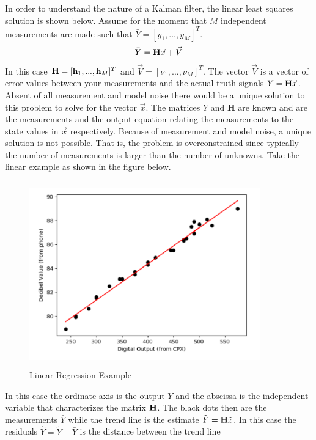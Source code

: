 \documentclass{article}
\begin{document}
In order to understand the nature of a Kalman filter, the linear least
squares solution is shown below. Assume for the moment that $M$
independent measurements are made such that $\bar{Y} = [\bar{y}_1,...,\bar{y}_M]^T$.
\begin{equation}
  \bar{Y} = {\bf H}\vec{x} + \vec{V}
\end{equation}
In this case ${\bf H} = [{\bf h}_1,...,{\bf h}_M]^T$ and $\vec{V} = [\nu_1,...,\nu_M]^T$. 
The vector $\vec{V}$ is a vector of error values between your
measurements and the actual truth signals $Y = {\bf H}\vec{x}$. Absent
of all measurement and model noise there 
would be a unique solution to this problem to solve for the vector
$\vec{x}$. The matrices $\bar{Y}$ and {\bf H} are
known and are the measurements and the output equation relating the
measurements to the state values in $\vec{x}$ respectively. Because of
measurement and model noise, a unique solution is not possible. That
is, the problem is overconstrained since typically the number of measurements is larger
than the number of unknowns. Take the linear example as shown in the
figure below.
\begin{figure}[H]
  \begin{center}
  \includegraphics[height=80mm, width=100mm]{Figures/Linear_Regression.png}
  \end{center}
  \caption{Linear Regression Example}\label{f:linear_regression}
\end{figure}
In this case the ordinate axis is the output $Y$ and the abscissa is
the independent variable that characterizes the matrix ${\bf H}$. The
black dots then are the measurements $\bar{Y}$ while the trend line is
the estimate $\tilde{Y} = {\bf H}\tilde{x}$. In this case the residuals
$\hat{Y} = \tilde{Y}-\bar{Y}$ is the distance between the trend line
\end{document}

